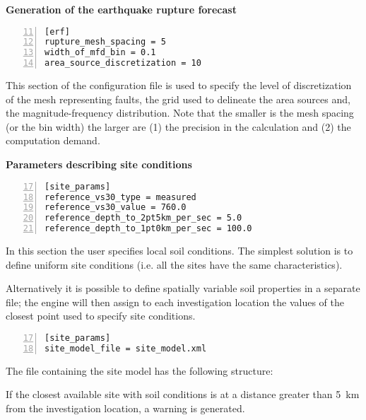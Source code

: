 \textbf{Generation of the earthquake rupture forecast}

\begin{Verbatim}[frame=single, commandchars=\\\{\}, fontsize=\small,
    firstnumber=11, numbers=left, numbersep=2pt]
[erf]
rupture_mesh_spacing = 5
width_of_mfd_bin = 0.1
area_source_discretization = 10
\end{Verbatim}

This section of the configuration file is used to specify the level of
discretization of the mesh representing faults, the grid used to delineate the
area sources and, the magnitude-frequency distribution. Note that the smaller
is the mesh spacing (or the bin width) the larger are (1) the precision in the
calculation and (2) the computation demand.



\textbf{Parameters describing site conditions}

\begin{Verbatim}[frame=single, commandchars=\\\{\}, fontsize=\small,
    firstnumber=17, numbers=left, numbersep=2pt]
[site_params]
reference_vs30_type = measured
reference_vs30_value = 760.0
reference_depth_to_2pt5km_per_sec = 5.0
reference_depth_to_1pt0km_per_sec = 100.0
\end{Verbatim}

In this section the user specifies local soil conditions. The simplest
solution is to define uniform site conditions (i.e. all the sites have  the
same characteristics).

Alternatively it is possible to define  spatially variable soil properties in
a separate file; the engine will then assign to each investigation location
the values of the closest point used to specify site conditions.

\begin{Verbatim}[frame=single, commandchars=\\\{\}, fontsize=\small,
    firstnumber=17, numbers=left, numbersep=2pt]
[site_params]
site_model_file = site_model.xml
\end{Verbatim}

The file containing the site model has the following structure:



If the closest available site with soil conditions is at a distance greater
than 5~km from the investigation location, a warning is generated.



